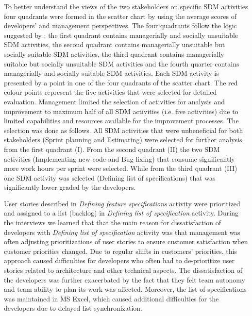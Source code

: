 To better understand the views of the two stakeholders on specific SDM activities four quadrants were formed in the scatter chart by using the average scores of developers’ and management perspectives. The four quadrants follow the logic suggested by \cite{DBLP:journals/comsis/VavpoticH12}: the first quadrant contains managerially and socially unsuitable SDM activities, the second quadrant contains managerially unsuitable but socially suitable SDM activities, the third quadrant contains managerially suitable but socially unsuitable SDM activities and the fourth quarter contains managerially and socially suitable SDM activities. Each SDM activity is presented by a point in one of the four quadrants of the scatter chart. The red colour points represent the five activities that were selected for detailed evaluation. Management limited the selection of activities for analysis and improvement to maximum half of all SDM activities (i.e. five activities) due to limited capabilities and resources available for the improvement processes. The selection was done as follows. All SDM activities that were unbeneficial for both stakeholders (Sprint planning and Estimating) were selected for further analysis from the first quadrant (I). From the second quadrant (II) the two SDM activities (Implementing new code and Bug fixing) that consume significantly more work hours per sprint were selected. While from the third quadrant (III) one SDM activity was selected (Defining list of specifications) that was significantly lower graded by the developers.

User stories described in \emph{Defining feature specifications} activity were prioritized and assigned to a list (backlog) in \emph{Defining list of specification} activity. During the interviews we learned that that the main reason for dissatisfaction of developers with \emph{Defining list of specification} activity was that management was often adjusting prioritizations of user stories to ensure customer satisfaction when customer priorities changed. Due to regular shifts in customers’ priorities, this approach caused difficulties for developers who often had to de-prioritize user stories related to architecture and other technical aspects. The dissatisfaction of the developers was further exacerbated by the fact that they felt team autonomy and team ability to plan its work was affected. Moreover, the list of specifications was maintained in MS Excel, which caused additional difficulties for the developers due to delayed list synchronization. 

